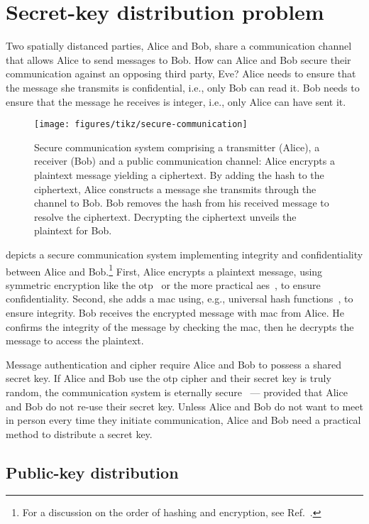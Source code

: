 \section{Secret-key distribution problem}

Two spatially distanced parties, Alice and Bob, share a communication channel that allows Alice to send messages to Bob.
How can Alice and Bob secure their communication against an opposing third party, Eve?
Alice needs to ensure that the message she transmits is confidential, i.e., only Bob can read it.
Bob needs to ensure that the message he receives is integer, i.e., only Alice can have sent it.
\begin{figure}[htb]
	\centering
	\texttt{[image: figures/tikz/secure-communication]}
	\caption{Secure communication system comprising a transmitter (Alice), a receiver (Bob) and a public communication channel: Alice encrypts a plaintext message yielding a ciphertext. By adding the hash to the ciphertext, Alice constructs a message she transmits through the channel to Bob. Bob removes the hash from his received message to resolve the ciphertext. Decrypting the ciphertext unveils the plaintext for Bob.}\label{fig:secure_communication}
\end{figure}
 depicts a secure communication system implementing integrity and confidentiality between Alice and Bob.\footnote{For a discussion on the order of hashing and encryption, see Ref.~\cite{Kohno2003,Krawczyk2001,Bellare2000}.}
First, Alice encrypts a plaintext message, using symmetric encryption like the \gls{otp}~\cite{Shannon1949} or the more practical \gls{aes}~\cite{Daemen1999}, to ensure confidentiality.
Second, she adds a \gls{mac} using, e.g., universal hash functions~\cite{Carter1979}, to ensure integrity.
Bob receives the encrypted message with \gls{mac} from Alice.
He confirms the integrity of the message by checking the \gls{mac}, then he decrypts the message to access the plaintext.

Message authentication and cipher require Alice and Bob to possess a shared secret key.
If Alice and Bob use the \gls{otp} cipher and their secret key is truly random, the communication system is eternally secure~\cite{Shannon1949} --- provided that Alice and Bob do not re-use their secret key.
Unless Alice and Bob do not want to meet in person every time they initiate communication, Alice and Bob need a practical method to distribute a secret key.

\subsection{Public-key distribution}

